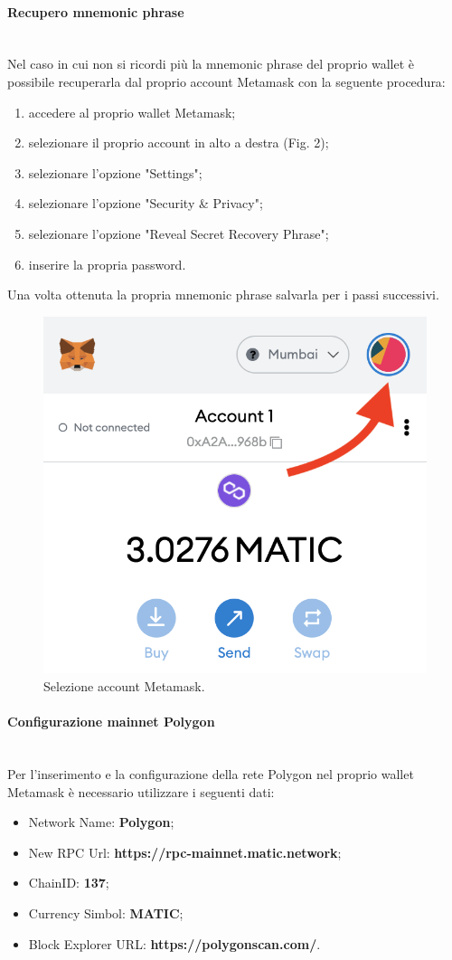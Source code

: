 \documentclass[a4paper, 12pt]{article}
\begin{document}
\paragraph{Recupero mnemonic phrase}\\
Nel caso in cui non si ricordi più la mnemonic phrase del proprio wallet è possibile recuperarla dal proprio account Metamask con la seguente procedura:
\begin{enumerate}
  \item accedere al proprio wallet Metamask;
  \item selezionare il proprio account in alto a destra (Fig. 2);
  \item selezionare l'opzione "Settings";
  \item selezionare l'opzione "Security \& Privacy";
  \item selezionare l'opzione "Reveal Secret Recovery Phrase";
  \item inserire la propria password.
\end{enumerate}
Una volta ottenuta la propria mnemonic phrase salvarla per i passi successivi.
\FloatBarrier
\begin{figure}[!h]
\centering
\includegraphics[width=0.4\linewidth]{img/account_meta.png}
\caption{Selezione account Metamask.}
\end{figure}
\FloatBarrier
\paragraph{Configurazione mainnet Polygon}\\
Per l'inserimento e la configurazione della rete Polygon nel proprio wallet Metamask è necessario utilizzare i seguenti dati:
\begin{itemize}
\item Network Name: \textbf{Polygon};
\item New RPC Url: \textbf{https://rpc-mainnet.matic.network};
\item ChainID: \textbf{137};
\item Currency Simbol: \textbf{MATIC};
\item Block Explorer URL: \textbf{https://polygonscan.com/}.
\end{itemize}
\end{document}
